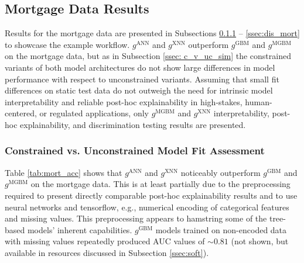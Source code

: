 \documentclass[information,article,submit,moreauthors,pdftex]{definitions/mdpi}
\begin{document}
\subsection{Mortgage Data Results}

Results for the mortgage data are presented in Subsections \ref{ssec:c_v_uc_mort} -- \ref{ssec:dis_mort} to showcase the example workflow.  $g^\text{ANN}$ and $g^\text{XNN}$ outperform $g^\text{GBM}$ and $g^\text{MGBM}$ on the mortgage data, but as in Subsection \ref{ssec: c_v_uc_sim} the constrained variants of both model architectures do not show large differences in model performance with respect to unconstrained variants. Assuming that small fit differences on static test data do not outweigh the need for intrinsic model interpretability and reliable post-hoc explainability in high-stakes, human-centered, or regulated applications, only $g^\text{MGBM}$ and $g^\text{XNN}$ interpretability, post-hoc explainability, and discrimination testing results are presented. 

\subsubsection{Constrained vs. Unconstrained Model Fit Assessment}\label{ssec:c_v_uc_mort}

Table \ref{tab:mort_acc} shows that $g^\text{ANN}$ and $g^\text{XNN}$ noticeably outperform $g^\text{GBM}$ and $g^\text{MGBM}$ on the mortgage data. This is at least partially due to the preprocessing required to present directly comparable post-hoc explainability results and to use neural networks and tensorflow, e.g., numerical encoding of categorical features and missing values. This preprocessing appears to hamstring some of the tree-based models' inherent capabilities. $g^\text{GBM}$ models trained on non-encoded data with missing values repeatedly produced AUC values of $\sim0.81$ (not shown, but available in resources discussed in Subsection \ref{ssec:soft}). 
\end{document}
